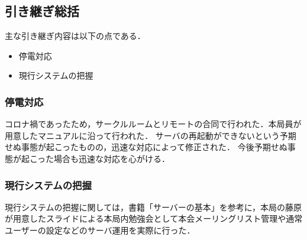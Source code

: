 \subsection*{引き継ぎ総括}


主な引き継ぎ内容は以下の点である．
\begin{itemize}
	\item 停電対応
	\item 現行システムの把握
\end{itemize}

\subsubsection*{停電対応}
コロナ禍であったため，サークルルームとリモートの合同で行われた．本局員が用意したマニュアルに沿って行われた．
サーバの再起動ができないという予期せぬ事態が起こったものの，迅速な対応によって修正された．
今後予期せぬ事態が起こった場合も迅速な対応を心がける．

\subsubsection*{現行システムの把握}
現行システムの把握に関しては，書籍「サーバーの基本」を参考に，本局の藤原が用意したスライドによる本局内勉強会として本会メーリングリスト管理や通常ユーザーの設定などのサーバ運用を実際に行った．

